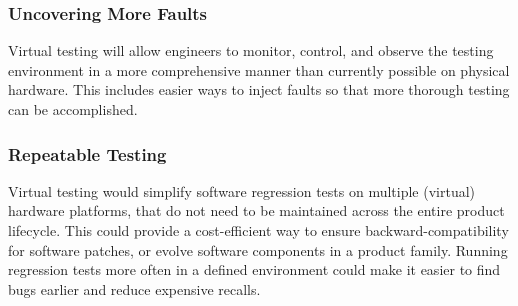 \subsubsection*{Uncovering More Faults}
Virtual testing will allow engineers to monitor, control, and observe the testing environment in a more comprehensive manner than currently possible on physical hardware.
This includes easier ways to inject faults so that more thorough testing can be accomplished.

\subsubsection*{Repeatable Testing}
Virtual testing would simplify software regression tests on multiple (virtual) hardware platforms,
that do not need to be maintained across the entire product lifecycle.
This could provide a cost-efficient way to ensure backward-compatibility for software patches,
or evolve software components in a product family.
Running regression tests more often in a defined environment could make it easier to find bugs earlier and reduce expensive recalls.



